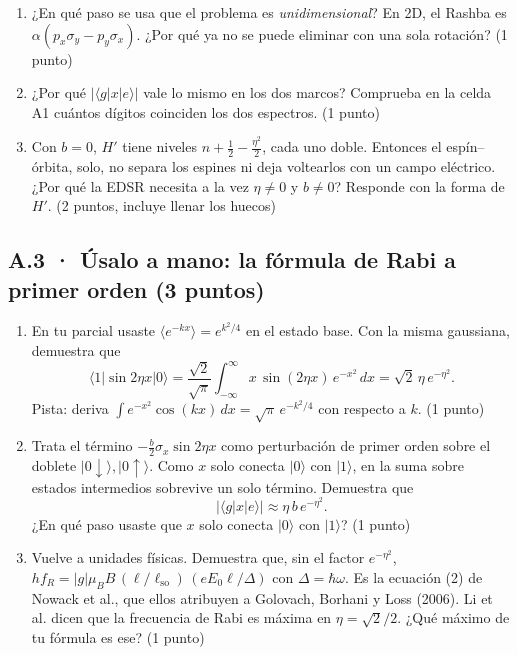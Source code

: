 \begin{enumerate}
\def\labelenumi{(\alph{enumi})}
\item ¿En qué paso se usa que el problema es \emph{unidimensional}? En 2D, el Rashba es $\alpha(p_x\sigma_y - p_y\sigma_x)$. ¿Por qué ya no se puede eliminar con una sola rotación? (1 punto)
\item ¿Por qué $|\langle g|x|e\rangle|$ vale lo mismo en los dos marcos? Comprueba en la celda A1 cuántos dígitos coinciden los dos espectros. (1 punto)
\item Con $b = 0$, $H'$ tiene niveles $n + \tfrac12 - \tfrac{\eta^2}{2}$, cada uno doble. Entonces el espín--órbita, solo, no separa los espines ni deja voltearlos con un campo eléctrico. ¿Por qué la EDSR necesita a la vez $\eta \ne 0$ y $b \ne 0$? Responde con la forma de $H'$. (2 puntos, incluye llenar los huecos)
\end{enumerate}


\subsection{A.3 · Úsalo a mano: la fórmula de Rabi a primer orden (3 puntos)}

\begin{enumerate}
\def\labelenumi{(\alph{enumi})}
\item En tu parcial usaste $\langle e^{-kx}\rangle = e^{k^2/4}$ en el estado base. Con la misma gaussiana, demuestra que
\[ \langle 1|\sin 2\eta x|0\rangle = \frac{\sqrt2}{\sqrt\pi}\int_{-\infty}^{\infty} x\,\sin(2\eta x)\,e^{-x^2}\,dx = \sqrt2\,\eta\,e^{-\eta^2}. \]
Pista: deriva $\int e^{-x^2}\cos(kx)\,dx = \sqrt\pi\, e^{-k^2/4}$ con respecto a $k$. (1 punto)
\item Trata el término $-\tfrac b2\sigma_x\sin 2\eta x$ como perturbación de primer orden sobre el doblete $|0{\downarrow}\rangle, |0{\uparrow}\rangle$. Como $x$ solo conecta $|0\rangle$ con $|1\rangle$, en la suma sobre estados intermedios sobrevive un solo término. Demuestra que
\[ |\langle g|x|e\rangle| \approx \eta\, b\, e^{-\eta^2}. \]
¿En qué paso usaste que $x$ solo conecta $|0\rangle$ con $|1\rangle$? (1 punto)
\item Vuelve a unidades físicas. Demuestra que, sin el factor $e^{-\eta^2}$, $h f_R = |g|\mu_B B\,(\ell/\ell_{\mathrm{so}})\,(eE_0\ell/\Delta)$ con $\Delta = \hbar\omega$. Es la ecuación (2) de Nowack et al., que ellos atribuyen a Golovach, Borhani y Loss (2006). Li et al. dicen que la frecuencia de Rabi es máxima en $\eta = \sqrt2/2$. ¿Qué máximo de tu fórmula es ese? (1 punto)
\end{enumerate}

